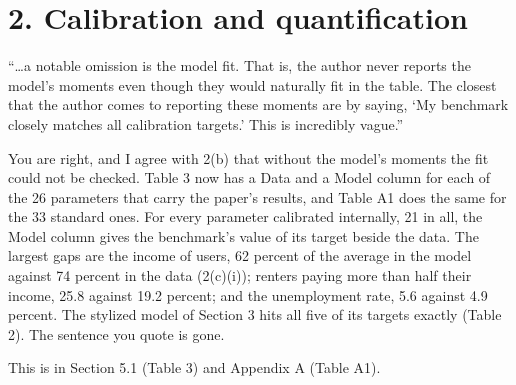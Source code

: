 \documentclass[11pt]{article}
\begin{document}
\section*{2. Calibration and quantification}

\begin{referee}
``\dots a notable omission is the model fit. That is, the author never reports the
model's moments even though they would naturally fit in the table. The closest
that the author comes to reporting these moments are by saying, `My benchmark
closely matches all calibration targets.' This is incredibly vague.''
\end{referee}
\begin{response}
\concede You are right, and I agree with 2(b) that without the model's moments
the fit could not be checked. Table 3 now has a Data and a Model column for each
of the 26 parameters that carry the paper's results, and Table A1 does the same
for the 33 standard ones. For every parameter calibrated internally, 21 in all,
the Model column gives the benchmark's value of its target beside the data. The
largest gaps are the income of users, 62
percent of the average in the model against 74 percent in the data (2(c)(i));
renters paying more than half their income, 25.8 against 19.2 percent; and the
unemployment rate, 5.6 against 4.9 percent. The stylized model of Section 3 hits
all five of its targets exactly (Table 2). The sentence you quote is gone.

This is in Section 5.1 (Table 3) and Appendix A (Table A1).
\end{response}
\end{document}
